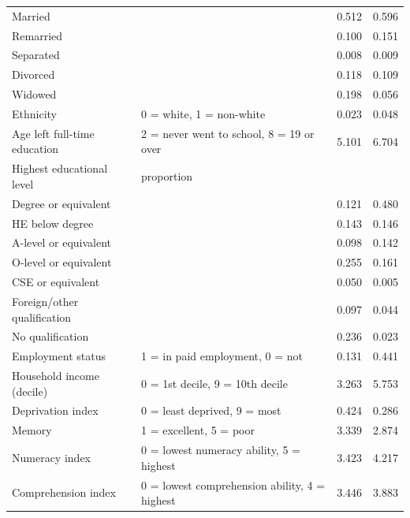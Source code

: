\begin{table}
\begin{tabular}{llcc}
        \hspace{0.5cm} Married &  & 0.512 & 0.596 \\
        \hspace{0.5cm} Remarried &  & 0.100 & 0.151 \\
        \hspace{0.5cm} Separated &  & 0.008 & 0.009 \\
        \hspace{0.5cm} Divorced &  & 0.118 & 0.109 \\
        \hspace{0.5cm} Widowed &  & 0.198 & 0.056 \\
        Ethnicity & 0 = white, 1 = non-white & 0.023 & 0.048 \\
        Age left full-time education & 2 = never went to school, 8 = 19 or over & 5.101 & 6.704 \\
        Highest educational level & proportion & & \\
        \hspace{0.5cm} Degree or equivalent &  & 0.121 & 0.480 \\
        \hspace{0.5cm} HE below degree &  & 0.143 & 0.146 \\
        \hspace{0.5cm} A-level or equivalent &  & 0.098 & 0.142 \\
        \hspace{0.5cm} O-level or equivalent &  & 0.255 & 0.161 \\
        \hspace{0.5cm} CSE or equivalent &  & 0.050 & 0.005 \\
        \hspace{0.5cm} Foreign/other qualification &  & 0.097 & 0.044 \\
        \hspace{0.5cm} No qualification &  & 0.236 & 0.023 \\
        Employment status & 1 = in paid employment, 0 = not & 0.131 & 0.441 \\
        Household income (decile) & 0 = 1st decile, 9 = 10th decile & 3.263 & 5.753 \\
        Deprivation index & 0 = least deprived, 9 = most & 0.424 & 0.286 \\
        Memory & 1 = excellent, 5 = poor & 3.339 & 2.874 \\
        Numeracy index & 0 = lowest numeracy ability, 5 = highest & 3.423 & 4.217 \\
        Comprehension index & 0 = lowest comprehension ability, 4 = highest & 3.446 & 3.883 \\
        \bottomrule
    \end{tabular}
\end{table}


